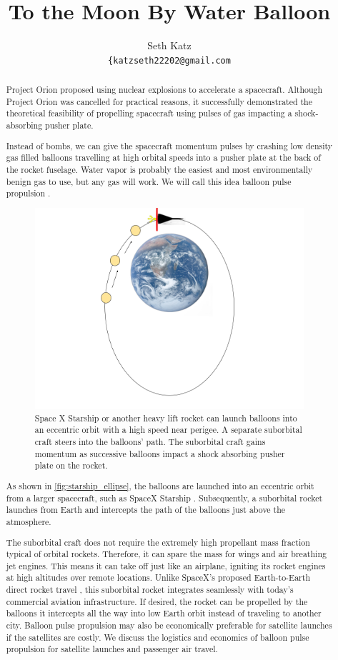 \documentclass{article}
\title{To the Moon By Water Balloon}
\author{
  Seth Katz \\
  \texttt{\{katzseth22202@gmail.com} \\
}
\begin{document}
\maketitle


\begin{abstract}
    Project Orion \cite{projorion} proposed using nuclear explosions to accelerate a spacecraft.  Although Project Orion was cancelled for practical reasons,  it successfully demonstrated the theoretical feasibility of propelling spacecraft using pulses of gas impacting a shock-absorbing pusher plate.

    Instead of bombs, we can give the spacecraft momentum pulses by crashing low density gas filled balloons travelling at high orbital speeds into a pusher plate at the back of the rocket fuselage.   Water vapor is probably the easiest and most environmentally benign gas to use, but any gas will work.   We will call this idea balloon pulse propulsion \cite{aim2024}.
 \begin{figure}[h]
    \centering
    \includegraphics[width=0.5\linewidth]{images/Starship_Impact_ellipse.png}
    \caption{Space X Starship or another heavy lift rocket  can launch balloons into an eccentric orbit with a high speed near perigee.   A separate suborbital craft steers into the balloons' path.   The suborbital craft gains momentum as successive balloons impact a shock absorbing pusher plate on the rocket.}
    \label{fig:starship_ellipse}
\end{figure}

As shown in \autoref{fig:starship_ellipse}, the balloons are launched into an eccentric orbit from a larger spacecraft, such as SpaceX Starship \cite{starship}.   Subsequently, a suborbital rocket launches from Earth and intercepts the path of the balloons just above the atmosphere.    

The suborbital craft does not require the extremely high propellant mass fraction typical of orbital rockets.   Therefore, it
 can spare the mass for wings and air breathing jet engines.   This means it can take off just like an airplane, igniting its rocket engines at high altitudes over remote locations. Unlike SpaceX’s proposed Earth-to-Earth direct rocket travel \cite{spacex_earth_earth}, this suborbital rocket integrates seamlessly with today’s commercial aviation infrastructure. If desired, the rocket can be propelled by the balloons it intercepts all the way into low Earth orbit instead of traveling to another city.  Balloon pulse propulsion may also be economically preferable for satellite launches if the satellites are costly.   We discuss the logistics and economics of balloon pulse propulsion for satellite launches and passenger air travel.


\end{abstract}
\end{document}
